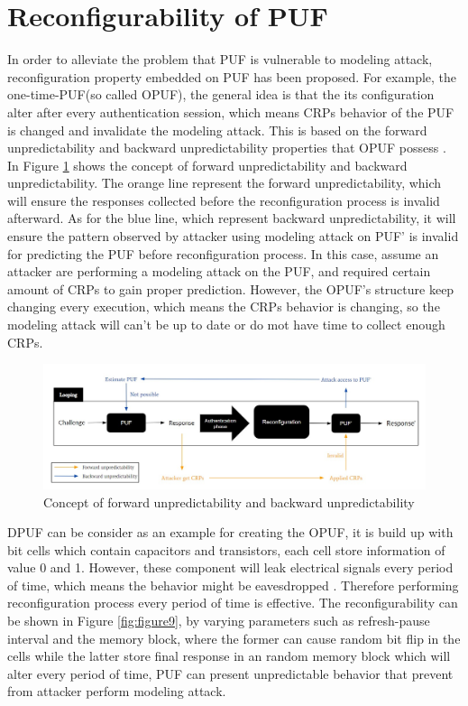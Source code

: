 \section{Reconfigurability of PUF}
In order to alleviate the problem that PUF is vulnerable to modeling attack, reconfiguration property embedded on PUF has been proposed. For example, the one-time-PUF(so called 
OPUF), the general idea is that the its configuration alter after every authentication session, which means CRPs behavior of the PUF is changed and invalidate the modeling attack. This is based on the
forward unpredictability and backward unpredictability properties that OPUF possess \cite{Reference7}. In Figure \ref{fig:figure8} shows the concept of forward unpredictability and backward unpredictability.
The orange line represent the forward unpredictability, which will ensure the responses collected before the reconfiguration process is invalid afterward. As for the blue line, 
which represent backward unpredictability, it will ensure the pattern observed by attacker using modeling attack on PUF' is invalid for predicting the PUF before reconfiguration process. 
In this case, assume an attacker are performing a modeling attack on the PUF, and required certain amount of CRPs to gain proper prediction. However, the OPUF's structure keep changing every execution, which means the CRPs 
behavior is changing, so the modeling attack will can't be up to date or do mot have time to collect enough CRPs.
\begin{figure}[htp]
    \centering
    \includegraphics[width=14cm]{figures/figure8.jpg}
    \caption{Concept of forward unpredictability and backward unpredictability}
    \label{fig:figure8}
    \end{figure}

DPUF can be consider as an example for creating the OPUF, it is build up with bit cells which contain capacitors and transistors, each cell store information of value 0 and 1. However, these component will leak 
electrical signals every period of time, which means the behavior might be eavesdropped \cite{Reference7}. Therefore performing reconfiguration process every period of time is effective. The reconfigurability can be shown in Figure \ref{fig:figure9}, by varying parameters
such as refresh-pause interval and the memory block, where the former can cause random bit flip in the cells while the latter store final response in an random memory block 
which will alter every period of time, PUF can present unpredictable behavior that prevent from attacker perform modeling attack.

